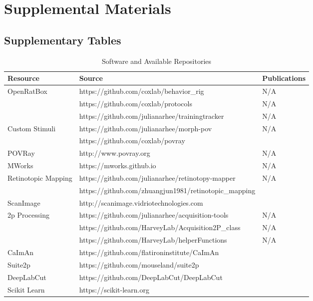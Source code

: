\chapter{Supplemental Materials}
\label{supplementals}


\section{Supplementary Tables}

\begin{table}[h]
  \caption{Software and Available Repositories}
  \centering
  \footnotesize
  \begin{tabular}{ p{2cm}p{7.7cm}p{4cm}  }
    \toprule
    Resource & Source & Publications \\
    \midrule
    OpenRatBox  & https://github.com/coxlab/behavior\_rig & N/A \\ 
                & https://github.com/coxlab/protocols & N/A \\ 
                & https://github.com/julianarhee/trainingtracker & N/A \\ 
    \midrule
    Custom Stimuli & https://github.com/julianarhee/morph-pov & N/A \\
                   & https://github.com/coxlab/povray & \citet{Zoccolan2009} \\
    POVRay  & http://www.povray.org & N/A \\
    MWorks  & https://mworks.github.io & N/A \\
    \midrule
    Retinotopic Mapping & https://github.com/julianarhee/retinotopy-mapper & N/A \\ 
                        & https://github.com/zhuangjun1981/retinotopic\_mapping & \citealt{Zhuang2017}\\
    \midrule
    ScanImage   & http://scanimage.vidriotechnologies.com & \citet{Pologruto2003} \\ 
    \midrule
    2p Processing  & https://github.com/julianarhee/acquisition-tools & N/A \\ 
                   & https://github.com/HarveyLab/Acquisition2P\_class & N/A \\
                   & https://github.com/HarveyLab/helperFunctions & N/A \\
    CaImAn & https://github.com/flatironinstitute/CaImAn  & \citet{Giovannucci2019,Pnevmatikakis2019} \\
    Suite2p & https://github.com/mouseland/suite2p & \cite{Pachitariu2017} \\
    \midrule
    DeepLabCut   & https://github.com/DeepLabCut/DeepLabCut & \citet{Mathis2018,Nath2019} \\
    \midrule
    Scikit Learn   & https://scikit-learn.org & \citet{Pedregosa2011} \\
    \bottomrule
  \end{tabular}
  \label{tab:software}
\end{table}

